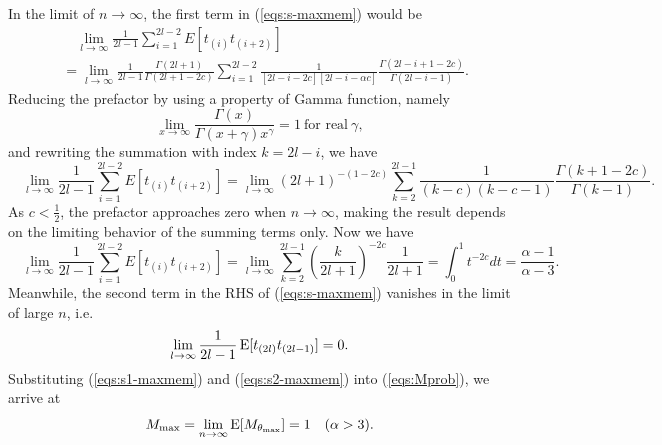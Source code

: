 In the limit of $ n \rightarrow \infty $, the first term in (\ref{eqs:s-maxmem}) would be
\begin{equation}
\begin{split}
	&\quad \lim_{l \rightarrow \infty} \frac{1}{2l-1} \sum_{i=1}^{2l-2} E[t_{(i)} t_{(i+2)}] \\
	&= \lim_{l \rightarrow \infty} \frac{1}{2l-1} \frac{\Gamma(2l+1)}{\Gamma(2l+1-2c)} \sum_{i=1}^{2l-2} \frac{1}{[2l-i-2c][2l-i-\alpha c]} \frac{\Gamma(2l-i+1-2c)}{\Gamma(2l-i-1)}.
\end{split}
\end{equation}
Reducing the prefactor by using a property of Gamma function, namely
\begin{equation}
	\lim_{x \rightarrow \infty} \frac{\Gamma(x)}{\Gamma(x+\gamma) x^\gamma} = 1 \ \text{for real}\ \gamma,
\end{equation}
and rewriting the summation with index $ k = 2l - i $, we have
\begin{equation}
\quad \lim_{l \rightarrow \infty} \frac{1}{2l-1} \sum_{i=1}^{2l-2} E[t_{(i)} t_{(i+2)}] = \lim_{l \rightarrow \infty} (2l+1)^{-(1-2c)} \sum_{k=2}^{2l-1} \frac{1}{(k-c)(k-c-1)} \frac{\Gamma(k+1-2c)}{\Gamma(k-1)}.
\end{equation}
As $ c < \frac{1}{2} $, the prefactor approaches zero when $ n \rightarrow \infty $, 
making the result depends on the limiting behavior of the summing terms only. Now we have
\begin{equation}
\quad \lim_{l \rightarrow \infty} \frac{1}{2l-1} \sum_{i=1}^{2l-2} E[t_{(i)} t_{(i+2)}] = \lim_{l \rightarrow \infty} \sum_{k=2}^{2l-1} (\frac{k}{2l+1})^{-2c} \frac{1}{2l+1} = \int_{0}^{1} t^{-2c} dt = \frac{\alpha-1}{\alpha-3}. \label{eqs:s1-maxmem}
\end{equation}
Meanwhile, the second term in the RHS of (\ref{eqs:s-maxmem}) vanishes in the limit of large $ n $, i.e.
\begin{equation}
	\lim_{l \rightarrow \infty} \frac{1}{2l-1} \E[t_{(2l)} t_{(2l-1)}] = 0. \label{eqs:s2-maxmem}
\end{equation}
Substituting (\ref{eqs:s1-maxmem}) and (\ref{eqs:s2-maxmem}) into (\ref{eqs:Mprob}), we arrive at 
\begin{equation}
	M_{\max} = \lim_{n \rightarrow \infty} \E[M_{\theta_{\max}}] = 1 \quad (\alpha>3). \label{eqs:max-mem-theory}
\end{equation}

